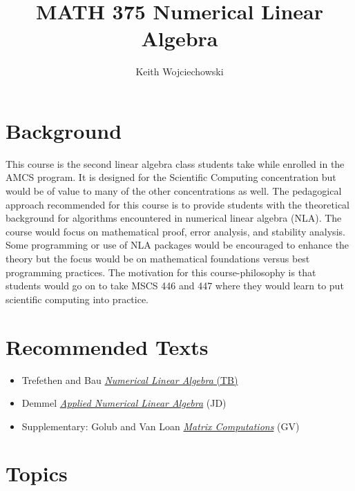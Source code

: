\documentclass[12pt]{article}
\begin{document}
\title{MATH 375 Numerical Linear Algebra}
\author{Keith Wojciechowski}

\maketitle{}

\section{Background}

This course is the second linear algebra class students take while enrolled in the AMCS program. It is designed for the Scientific Computing concentration but would be of value to many of the other concentrations as well. The pedagogical approach recommended for this course is to provide students with the theoretical background for algorithms encountered in numerical linear algebra (NLA). The course would focus on mathematical proof, error analysis, and stability analysis. Some programming or use of NLA packages would be encouraged to enhance the theory but the focus would be on mathematical foundations versus best programming practices. The motivation for this course-philosophy is that students would go on to take MSCS 446 and 447 where they would learn to put scientific computing into practice.

\section{Recommended Texts}

\begin{itemize}
	\item Trefethen and Bau \href{https://www.amazon.com/Numerical-Linear-Algebra-Lloyd-Trefethen/dp/0898713617/ref=pd_sbs_14_t_0?_encoding=UTF8&psc=1&refRID=Q8PBY7X2H4TGFRG3C6B8}{\emph{Numerical Linear Algebra} (TB)}
	\item Demmel \href{https://www.amazon.com/Applied-Numerical-Linear-Algebra-Demmel/dp/0898713897#reader_0898713897}{\emph{Applied Numerical Linear Algebra}} (JD)
	\item Supplementary: Golub and Van Loan \href{https://www.amazon.com/Computations-Hopkins-Studies-Mathematical-Sciences/dp/1421407949/ref=pd_bxgy_14_img_2?_encoding=UTF8&psc=1&refRID=QYCM1GH65WFMA9FTGART}{\emph{Matrix Computations}} (GV)
\end{itemize}

\section{Topics}
\end{document}
